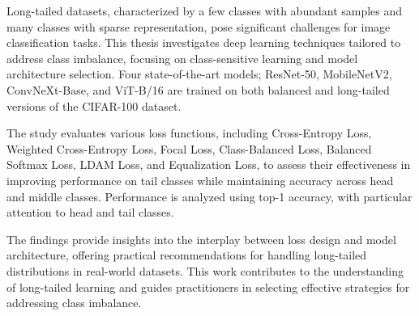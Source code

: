 Long-tailed datasets, characterized by a few classes with abundant samples and many classes with sparse representation, pose significant challenges for image classification tasks. This thesis investigates deep learning techniques tailored to address class imbalance, focusing on class-sensitive learning and model architecture selection. Four state-of-the-art models; ResNet-50, MobileNetV2, ConvNeXt-Base, and ViT-B/16 are trained on both balanced and long-tailed versions of the CIFAR-100 dataset.

The study evaluates various loss functions, including Cross-Entropy Loss, Weighted Cross-Entropy Loss, Focal Loss, Class-Balanced Loss, Balanced Softmax Loss, LDAM Loss, and Equalization Loss, to assess their effectiveness in improving performance on tail classes while maintaining accuracy across head and middle classes. Performance is analyzed using top-1 accuracy, with particular attention to head and tail classes.

The findings provide insights into the interplay between loss design and model architecture, offering practical recommendations for handling long-tailed distributions in real-world datasets. This work contributes to the understanding of long-tailed learning and guides practitioners in selecting effective strategies for addressing class imbalance.

